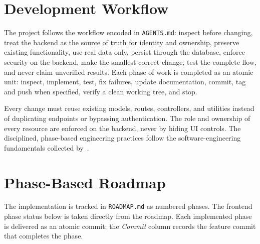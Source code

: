 
\section{Development Workflow}

The project follows the workflow encoded in \texttt{AGENTS.md}: inspect before
changing, treat the backend as the source of truth for identity and ownership,
preserve existing functionality, use real data only, persist through the
database, enforce security on the backend, make the smallest correct change,
test the complete flow, and never claim unverified results. Each phase of work
is completed as an atomic unit: inspect, implement, test, fix failures, update
documentation, commit, tag and push when specified, verify a clean working
tree, and stop.

Every change must reuse existing models, routes, controllers, and utilities
instead of duplicating endpoints or bypassing authentication. The role and
ownership of every resource are enforced on the backend, never by hiding UI
controls. The disciplined, phase-based engineering practices follow the
software-engineering fundamentals collected by~\cite{sommerville}.

\section{Phase-Based Roadmap}

The implementation is tracked in \texttt{ROADMAP.md} as numbered phases. The
frontend phase status below is taken directly from the roadmap. Each
implemented phase is delivered as an atomic commit; the \emph{Commit} column
records the feature commit that completes the phase.

